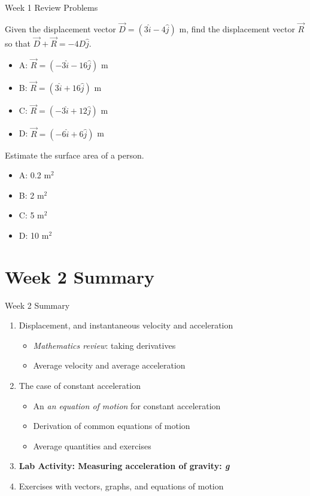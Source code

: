 \documentclass{beamer}
\begin{document}
\begin{frame}{Week 1 Review Problems}
\small
\begin{minipage}[b]{0.45\linewidth}
Given the displacement vector $\vec{D} = (3\hat{i}-4\hat{j})$ m, find the displacement vector $\vec{R}$ so that $\vec{D} + \vec{R} = -4D\hat{j}$.
\begin{itemize}
\item A: $\vec{R} =  (-3\hat{i}-16\hat{j})$ m
\item B: $\vec{R} =  (3\hat{i}+16\hat{j})$ m
\item C: $\vec{R} =  (-3\hat{i}+12\hat{j})$ m
\item D: $\vec{R} =  (-6\hat{i}+6\hat{j})$ m
\end{itemize}
\end{minipage}
\hspace{0.5cm}
\begin{minipage}[b]{0.45\linewidth}
Estimate the surface area of a person.
\vspace{1cm}
\begin{itemize}
\item A: 0.2 m$^2$
\item B: 2 m$^2$
\item C: 5 m$^2$
\item D: 10 m$^2$
\end{itemize}
\end{minipage}
\end{frame}

\section{Week 2 Summary}

\begin{frame}{Week 2 Summary}
\begin{enumerate}
\item Displacement, and instantaneous velocity and acceleration
\begin{itemize}
\item \textit{Mathematics review}: taking derivatives
\item Average velocity and average acceleration
\end{itemize}
\item The case of constant acceleration
\begin{itemize}
\item An \textit{an equation of motion} for constant acceleration
\item Derivation of \alert{common equations of motion}
\item Average quantities and exercises
\end{itemize}
\item \textbf{Lab Activity: Measuring acceleration of gravity: \textit{g}}
\item Exercises with vectors, graphs, and equations of motion
\end{enumerate}
\end{frame}
\end{document}
